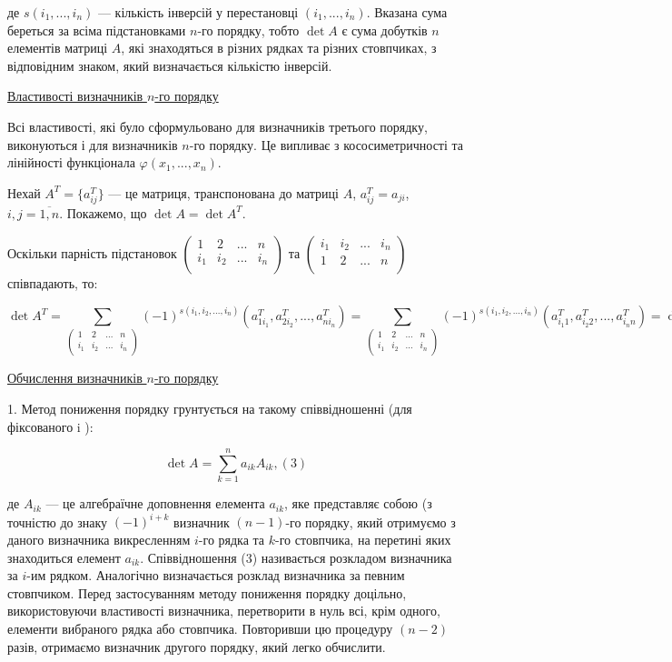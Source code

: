 де $s(i_1, ..., i_n)$ --- кількість інверсій у перестановці $(i_1, ..., i_n)$. Вказана сума береться
за всіма підстановками $n$-го порядку, тобто $\det A$ є сума добутків $n$ елементів
матриці $A$, які знаходяться в різних рядках та різних стовпчиках, з відповідним
знаком, який визначається кількістю інверсій.

\underline{Властивості визначників $n$-го порядку}

Всі властивості, які було сформульовано для визначників третього порядку,
виконуються і для визначників $n$-го порядку. Це випливає з кососиметричності та
лінійності функціонала $\varphi(x_1, ..., x_n)$.

Нехай $A^T = \{a_{ij}^T\}$ --- це матриця, транспонована до матриці $A$, $a_{ij}^T = a_{ji}$,
$i, j = \overline{1,n}$. Покажемо, що $\det A = \det A^T$.

Оскільки парність підстановок $\begin{pmatrix}
	1 & 2 & ... & n \\
	i_1 & i_2 & ... & i_n \\
\end{pmatrix}$ та $\begin{pmatrix}
	i_1 & i_2 & ... & i_n \\	
	1 & 2 & ... & n \\
\end{pmatrix}$ співпадають, то:

$$\det A^T
= \sum\limits_{ \begin{pmatrix}
				 	1 & 2 & ... & n \\
			 		i_1 & i_2 & ... & i_n \\
				\end{pmatrix} }
	(-1)^{s(i_1, i_2, ..., i_n)} (a_{1 i_1}^T, a_{2 i_2}^T, ..., a_{n i_n}^T)
= \sum\limits_{ \begin{pmatrix}
				 	1 & 2 & ... & n \\
			 		i_1 & i_2 & ... & i_n \\
				\end{pmatrix} }
	(-1)^{s(i_1, i_2, ..., i_n)} (a_{i_1 1}^T, a_{i_2 2}^T, ..., a_{i_n n}^T)
= \det A.$$


\underline{Обчислення визначників $n$-го порядку}

1. Метод пониження порядку грунтується на такому співвідношенні (для фіксованого i ):

$$\det A = \sum\limits_{k=1}^n a_{ik} A_{ik}, (3)$$


де $A_{ik}$ --- це алгебраїчне доповнення елемента $a_{ik}$, яке представляє собою (з точністю
до знаку $(-1)^{i+k}$ визначник $(n-1)$-го порядку, який отримуємо з даного 
визначника викресленням $i$-го рядка та $k$-го стовпчика, на перетині яких
знаходиться елемент $a_{ik}$. Співвідношення (3) називається розкладом визначника
за $i$-им рядком. Аналогічно визначається розклад визначника за певним
стовпчиком. Перед застосуванням методу пониження порядку доцільно,
використовуючи властивості визначника, перетворити в нуль всі, крім одного,
елементи вибраного рядка або стовпчика. Повторивши цю процедуру $(n-2)$ разів,
отримаємо визначник другого порядку, який легко обчислити.


